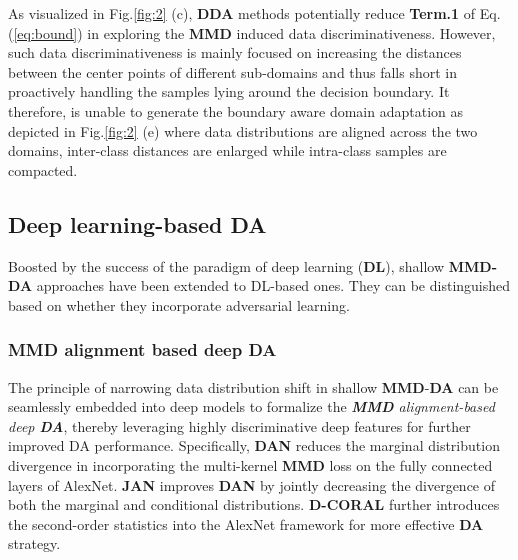 As visualized in Fig.\ref{fig:2} (c),  \textbf{DDA} methods potentially reduce \textbf{Term.1} of Eq.(\ref{eq:bound}) in exploring the \textbf{MMD} induced data discriminativeness. However, such data discriminativeness is mainly focused on increasing the distances between the center points of different sub-domains and thus falls short in proactively handling the samples lying around the decision boundary. It therefore, is unable to generate the boundary aware domain adaptation as depicted in Fig.\ref{fig:2} (e) where data distributions are aligned across the two domains, inter-class distances are enlarged while intra-class samples are compacted. 





\subsection{Deep learning-based \textbf{DA}}
\label{subsect: Deep DA}


Boosted by the success of the paradigm of deep learning (\textbf{DL}),  shallow \textbf{MMD-DA} approaches have been extended to DL-based ones. They can be distinguished based on whether they incorporate adversarial learning.





\subsubsection{MMD alignment based deep DA}

The principle of narrowing data distribution shift in shallow \textbf{MMD}-\textbf{DA} can be seamlessly embedded into deep models to formalize the \textit{\textbf{MMD} alignment-based deep \textbf{DA}}, thereby leveraging  highly discriminative deep features for further improved DA performance. Specifically, \textbf{DAN}\cite{long2015learning} reduces the marginal distribution divergence in incorporating the multi-kernel \textbf{MMD} loss on the fully connected layers of AlexNet. \textbf{JAN}\cite{DBLP:conf/icml/LongZ0J17} improves \textbf{DAN} by jointly decreasing the divergence of both the marginal and conditional distributions. \textbf{D-CORAL}\cite{sun2016deep} further introduces the second-order statistics into the AlexNet\cite{krizhevsky2012imagenet} framework for more effective \textbf{DA} strategy. 
 



